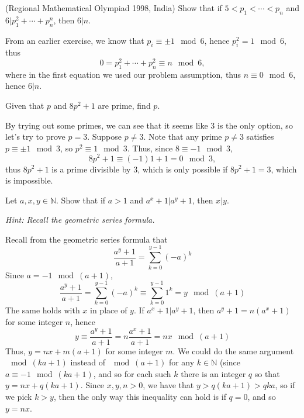 \documentclass[11pt,dvipsnames]{book}
\numberwithin{equation}{section} %
\numberwithin{figure}{section} %
\numberwithin{table}{section} %
\begin{document}
\begin{exercise}
\begin{exercise}
\end{exercise}


\begin{exercise} (Regional Mathematical Olympiad 1998, India) Show that if $5<p_{1}<\cdots < p_{n}$ and $6|p_{1}^{2}+\cdots + p_{n}^{n}$, then $6|n$. 

\begin{solution}
From an earlier exercise, we know that $p_{i}\equiv \pm 1 \mod 6$, hence $p_{i}^{2} = 1 \mod 6$, thus 
\[
0=p_{1}^{2}+\cdots + p_{n}^{2} \equiv n\mod 6,
\]
where in the first equation we used our problem assumption, thus $n\equiv 0\mod 6$, hence $6|n$. 
\end{solution}


\end{exercise}


%
%


\begin{exercise} Given that $p$ and $8p^2+1$ are prime, find $p$. 

\begin{solution}
By trying out some primes, we can see that it seems like $3$ is the only option, so let's try to prove $p=3$. Suppose $p\neq 3$. Note that any prime $p\neq 3$ satisfies $p\equiv \pm 1 \mod 3$, so $p^2 \equiv 1 \mod 3$. Thus, since $8\equiv -1\mod 3$, 
\[
8p^2+1\equiv (-1)1+1=0\mod 3,\]
thus $8p^2+1$ is a prime divisible by 3, which is only possible if $8p^2+1=3$, which is impossible.
\end{solution}


\end{exercise}


\begin{exercise} Let $a,x,y\in \mathbb{N}$. Show that if $a>1$ and $a^x+1|a^y+1$, then $x|y$. 

{\it Hint: Recall the geometric series formula.}

\begin{solution}
Recall from the geometric series formula that
\[
\frac{a^y+1}{a+1}   = \sum_{k=0}^{y-1}(-a)^{k}
\]
Since $a=-1 \mod (a+1)$,
\[
\frac{a^y+1}{a+1} = \sum_{k=0}^{y-1}(-a)^{k}\equiv \sum_{k=0}^{y-1}1^k=y\mod(a+1)
\]
The same holds with $x$ in place of $y$. If $a^x+1|a^y+1$, then $a^y+1 = n (a^x+1)$ for some integer $n$, hence
\[
y \equiv \frac{a^{y}+1}{a+1}= n \frac{a^{x}+1}{a+1} = nx \mod (a+1)
\]
Thus, $y= nx + m(a+1)$ for some integer $m$. We could do the same argument $\mod (ka+1)$ instead of $\mod (a+1)$ for any $k\in\mathbb{N}$ (since $a\equiv -1 \mod (ka+1)$, and so for each such $k$ there is an integer $q$ so that $y=nx+q(ka+1)$. Since $x,y,n>0$, we have that $y>q(ka+1)>qka$, so if we pick $k>y$, then the only way this inequality can hold is if $q=0$, and so $y=nx$. 
\end{solution}



\end{exercise}
\end{exercise}
\end{document}
